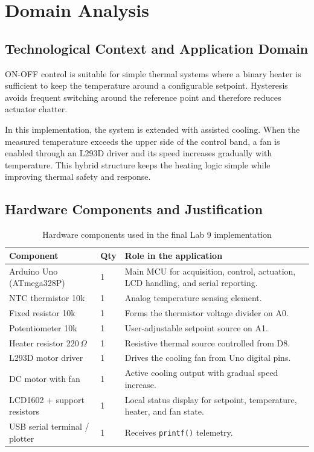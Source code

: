 \documentclass[12pt]{article}
\begin{document}
\section{Domain Analysis}

\subsection{Technological Context and Application Domain}
\hspace{0.8cm} ON-OFF control is suitable for simple thermal systems where a binary heater is sufficient to keep the temperature around a configurable setpoint. Hysteresis avoids frequent switching around the reference point and therefore reduces actuator chatter.

\hspace{0.8cm} In this implementation, the system is extended with assisted cooling. When the measured temperature exceeds the upper side of the control band, a fan is enabled through an L293D driver and its speed increases gradually with temperature. This hybrid structure keeps the heating logic simple while improving thermal safety and response.

\subsection{Hardware Components and Justification}

\begin{table}[H]
\centering
\begin{tabular}{p{4.4cm} p{1.3cm} p{7.2cm}}
\toprule
\textbf{Component} & \textbf{Qty} & \textbf{Role in the application} \\
\midrule
Arduino Uno (ATmega328P) & 1 & Main MCU for acquisition, control, actuation, LCD handling, and serial reporting. \\
NTC thermistor 10k & 1 & Analog temperature sensing element. \\
Fixed resistor 10k & 1 & Forms the thermistor voltage divider on A0. \\
Potentiometer 10k & 1 & User-adjustable setpoint source on A1. \\
Heater resistor 220\,$\Omega$ & 1 & Resistive thermal source controlled from D8. \\
L293D motor driver & 1 & Drives the cooling fan from Uno digital pins. \\
DC motor with fan & 1 & Active cooling output with gradual speed increase. \\
LCD1602 + support resistors & 1 & Local status display for setpoint, temperature, heater, and fan state. \\
USB serial terminal / plotter & 1 & Receives \texttt{printf()} telemetry. \\
\bottomrule
\end{tabular}
\caption{Hardware components used in the final Lab 9 implementation}
\label{tab:hardware}
\end{table}
\end{document}
